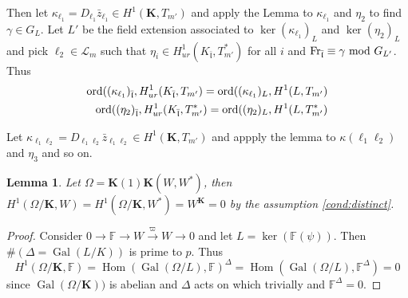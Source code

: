 \documentclass[leqno]{amsart}
\newcommand{\fF}{\mathbb{F}} %
\newcommand{\flw}{\bar{\fl}}
\newcommand{\Fr}{\textnormal{Fr}} %
\DeclareMathOperator{\Gal}{Gal}
\newcommand{\ord}{\textnormal{ord}}
\newcommand{\K}{{\mathbf{K}}} %
\newcommand{\fl}{\mathfrak{l}}
\DeclareMathOperator{\Hom}{Hom}
\newtheorem{lem}[thm]{Lemma}
\theoremstyle{definition}
\theoremstyle{remark}
\begin{document}
Then let $\kappa_{\ell_1}=D_{\ell_1}\bar{z}_{\ell_1}\in H^1(\K,T_{m'})$
and apply the Lemma to $\kappa_{\ell_1}$ and $\eta_2$
to find  $\gamma\in G_L$.
Let  $L'$ be the field extension
associated to  $\ker(\kappa_{\ell_1})_L$ and $\ker(\eta_2)_L$
and pick $\ell_2\in \mathcal{L}_m$ such that
 $\eta_i\in H^1_{ur}(K_{\flw},T_{m'}^*)$ for all $i$
and  $\Fr_{\flw}\equiv \gamma \text{ mod }G_{L'}$.
Thus 
\begin{align}
	\ord( (\kappa_{\ell_1})_{\flw}, H^1_{ur}(K_{\flw}, T_{m'})=
	\ord( (\kappa_{\ell_1})_{L}, H^1(L, T_{m'})\\
	\ord( (\eta_2)_{\flw}, H^1_{ur}(K_{\flw}, T_{m'}^*)=
	\ord( (\eta_2)_{L}, H^1(L, T_{m'}^*)
\end{align}

Let $\kappa_{\ell_1\ell_2}=D_{\ell_1\ell_2}\bar{z}_{\ell_1\ell_2}\in
H^1(\K,T_{m'})$ and appply the lemma to 
$\kappa(\ell_1\ell_2)$ and  $\eta_3$ and so on.

 \begin{lem}
	Let $\Omega=\K(1)\K(W,W^*)$, then 
	$H^1(\Omega/\K, W)=H^1(\Omega/\K, W^*)= W^\K=0$ 
	by the assumption \eqref{cond:distinct}.
\end{lem}
\begin{proof}
	Consider 
	$0\to\fF\to W\xrightarrow{\varpi}W\to 0$
	and let  $L=\ker(\fF(\psi))$.
	Then  $\#(\Delta=\Gal(L/K))$ is prime to $p$. Thus
	 \[
		H^1(\Omega/\K,\fF)=
		\Hom(\Gal(\Omega/L),\fF)^\Delta=
		\Hom(\Gal(\Omega/L),\fF^\Delta)=0
	\]
	since $\Gal(\Omega/\K))$ is abelian
	and $\Delta$ acts on  which trivially
	and $\fF^\Delta=0$.
\end{proof}





\end{document}
